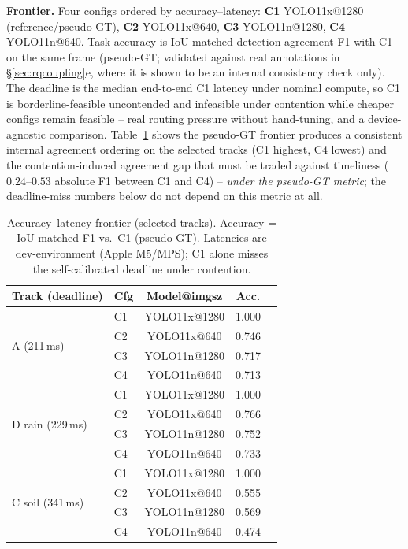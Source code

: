 \documentclass[conference]{IEEEtran}
\begin{document}
\textbf{Frontier.} Four configs ordered by accuracy--latency:
\textbf{C1} YOLO11x@1280 (reference/pseudo-GT), \textbf{C2}
YOLO11x@640, \textbf{C3} YOLO11n@1280, \textbf{C4} YOLO11n@640.
Task accuracy is IoU-matched detection-agreement F1 with C1 on the
same frame (pseudo-GT; validated against real annotations in
\S\ref{sec:rqcoupling}e, where it is shown to be an internal
consistency check only). The deadline is the median end-to-end C1
latency under nominal compute, so C1 is borderline-feasible
uncontended and infeasible under contention while cheaper configs
remain feasible -- real routing pressure without hand-tuning, and a
device-agnostic comparison. Table~\ref{tab:frontier} shows the
pseudo-GT frontier produces a consistent internal agreement ordering
on the selected tracks (C1 highest, C4 lowest) and the
contention-induced agreement gap that must be traded against
timeliness ($0.24$--$0.53$ absolute F1 between C1 and C4) --
\emph{under the pseudo-GT metric}; the deadline-miss numbers below do
not depend on this metric at all.

\begin{table}[htbp]
\caption{Accuracy--latency frontier (selected tracks). Accuracy =
IoU-matched F1 vs.\ C1 (pseudo-GT). Latencies are dev-environment
(Apple M5/MPS); C1 alone misses the self-calibrated deadline under
contention.}
\label{tab:frontier}
\centering
\footnotesize
\setlength{\tabcolsep}{3pt}
\begin{tabular}{llccc}
\toprule
\textbf{Track (deadline)} & \textbf{Cfg} & \textbf{Model@imgsz} & \textbf{Acc.} \\
\midrule
\multirow{4}{*}{A (211\,ms)}
 & C1 & YOLO11x@1280 & 1.000 \\
 & C2 & YOLO11x@640  & 0.746 \\
 & C3 & YOLO11n@1280 & 0.717 \\
 & C4 & YOLO11n@640  & 0.713 \\
\midrule
\multirow{4}{*}{D rain (229\,ms)}
 & C1 & YOLO11x@1280 & 1.000 \\
 & C2 & YOLO11x@640  & 0.766 \\
 & C3 & YOLO11n@1280 & 0.752 \\
 & C4 & YOLO11n@640  & 0.733 \\
\midrule
\multirow{4}{*}{C soil (341\,ms)}
 & C1 & YOLO11x@1280 & 1.000 \\
 & C2 & YOLO11x@640  & 0.555 \\
 & C3 & YOLO11n@1280 & 0.569 \\
 & C4 & YOLO11n@640  & 0.474 \\
\bottomrule
\end{tabular}
\end{table}
\end{document}
